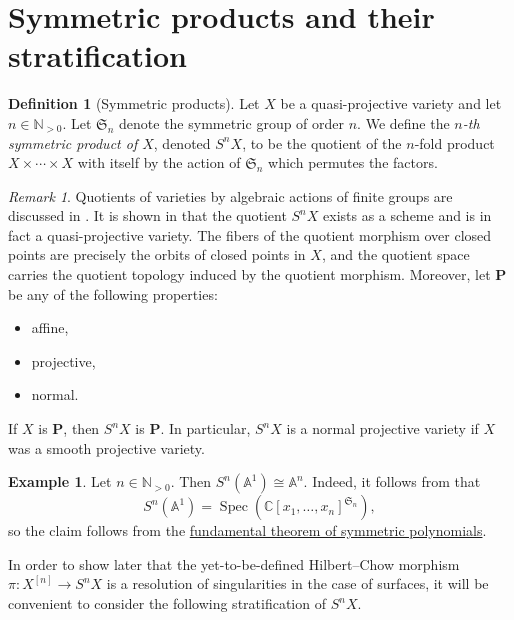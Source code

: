 \documentclass[12pt,a4paper]{amsart}
\theoremstyle{plain}
\theoremstyle{definition}
\newtheorem{defn}[thm]{Definition}
\newtheorem{exmp}[thm]{Example}
\theoremstyle{remark}
\newtheorem{rem}[thm]{Remark}
\begin{document}
\section{Symmetric products and their stratification}

\begin{defn}[Symmetric products]
  Let $X$ be a quasi-projective variety and let $n \in \mathbb{N}_{>0}$.
  Let $\mathfrak{S}_{n}$ denote the symmetric group of order $n$.
  We define the \textit{$n$-th symmetric product of $X$}, denoted $S^{n}X$, to be the quotient of the $n$-fold product $X \times \cdots \times X$ with itself by the action of $\mathfrak{S}_{n}$ which permutes the factors.
\end{defn}

\begin{rem}
  Quotients of varieties by algebraic actions of finite groups are discussed in .
  It is shown in  that the quotient $S^{n}X$ exists as a scheme and is in fact a quasi-projective variety.
  The fibers of the quotient morphism over closed points are precisely the orbits of closed points in $X$, and the quotient space carries the quotient topology induced by the quotient morphism.
  Moreover, let $\mathbf{P}$ be any of the following properties:
  \begin{itemize}
    \item affine,
    \item projective,
    \item normal.
  \end{itemize}
  If $X$ is $\mathbf{P}$, then $S^{n}X$ is $\mathbf{P}$.
  In particular, $S^{n}X$ is a normal projective variety if $X$ was a smooth projective variety.
\end{rem}

\begin{exmp}\label{exmp:affineline}
  Let $n \in \mathbb{N}_{>0}$.
  Then $S^{n}(\mathbb{A}^{1}) \cong \mathbb{A}^{n}$.
  Indeed, it follows from  that
  \[ S^{n}(\mathbb{A}^{1}) = \operatorname{Spec}\left(\mathbb{C}[x_{1}, \ldots, x_{n}]^{\mathfrak{S}_{n}}\right), \]
  so the claim follows from the \href{https://en.wikipedia.org/wiki/Elementary_symmetric_polynomial#Fundamental_theorem_of_symmetric_polynomials}{fundamental theorem of symmetric polynomials}.
\end{exmp}

In order to show later that the yet-to-be-defined Hilbert--Chow morphism $\pi \colon X^{[n]} \to S^{n}X$ is a resolution of singularities in the case of surfaces, it will be convenient to consider the following stratification of $S^{n}X$.
\end{document}
